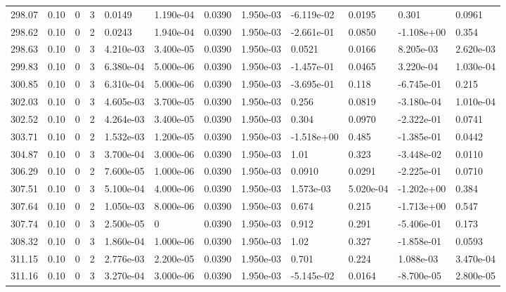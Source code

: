 \documentclass[preview]{standalone}
\begin{document}
{{{{{{{{{{\begin{tabular}{L{1.2cm}C{1.2cm} C{0.3cm}C{0.5cm} C{1.4cm}C{1.4cm} C{1.4cm}C{1.4cm} C{1.6cm}C{1.6cm} C{1.6cm}C{1.6cm}}
  298.07  &  0.10  & 0     &  3 &  0.0149  & 1.190e-04  &  0.0390&   1.950e-03& -6.119e-02 & 0.0195   &  0.301 & 0.0961  \\ 
  298.62  &  0.10  & 0     &  2 &  0.0243  & 1.940e-04  &  0.0390&   1.950e-03& -2.661e-01 & 0.0850   &  -1.108e+00 & 0.354  \\ 
  298.63  &  0.10  & 0     &  3 &  4.210e-03  & 3.400e-05  &  0.0390&   1.950e-03& 0.0521 & 0.0166   &  8.205e-03 & 2.620e-03  \\ 
  299.83  &  0.10  & 0     &  3 &  6.380e-04  & 5.000e-06  &  0.0390&   1.950e-03& -1.457e-01 & 0.0465   &  3.220e-04 & 1.030e-04  \\ 
  300.85  &  0.10  & 0     &  3 &  6.310e-04  & 5.000e-06  &  0.0390&   1.950e-03& -3.695e-01 & 0.118   &  -6.745e-01 & 0.215  \\ 
  302.03  &  0.10  & 0     &  3 &  4.605e-03  & 3.700e-05  &  0.0390&   1.950e-03& 0.256 & 0.0819   &  -3.180e-04 & 1.010e-04  \\ 
  302.52  &  0.10  & 0     &  2 &  4.264e-03  & 3.400e-05  &  0.0390&   1.950e-03& 0.304 & 0.0970   &  -2.322e-01 & 0.0741  \\ 
  303.71  &  0.10  & 0     &  2 &  1.532e-03  & 1.200e-05  &  0.0390&   1.950e-03& -1.518e+00 & 0.485   &  -1.385e-01 & 0.0442  \\ 
  304.87  &  0.10  & 0     &  3 &  3.700e-04  & 3.000e-06  &  0.0390&   1.950e-03& 1.01 & 0.323   &  -3.448e-02 & 0.0110  \\ 
  306.29  &  0.10  & 0     &  2 &  7.600e-05  & 1.000e-06  &  0.0390&   1.950e-03& 0.0910 & 0.0291   &  -2.225e-01 & 0.0710  \\ 
  307.51  &  0.10  & 0     &  3 &  5.100e-04  & 4.000e-06  &  0.0390&   1.950e-03& 1.573e-03 & 5.020e-04   &  -1.202e+00 & 0.384  \\ 
  307.64  &  0.10  & 0     &  2 &  1.050e-03  & 8.000e-06  &  0.0390&   1.950e-03& 0.674 & 0.215   &  -1.713e+00 & 0.547  \\ 
  307.74  &  0.10  & 0     &  3 &  2.500e-05  & 0  &  0.0390&   1.950e-03& 0.912 & 0.291   &  -5.406e-01 & 0.173  \\ 
  308.32  &  0.10  & 0     &  3 &  1.860e-04  & 1.000e-06  &  0.0390&   1.950e-03& 1.02 & 0.327   &  -1.858e-01 & 0.0593  \\ 
  311.15  &  0.10  & 0     &  2 &  2.776e-03  & 2.200e-05  &  0.0390&   1.950e-03& 0.701 & 0.224   &  1.088e-03 & 3.470e-04  \\ 
  311.16  &  0.10  & 0     &  3 &  3.270e-04  & 3.000e-06  &  0.0390&   1.950e-03& -5.145e-02 & 0.0164   &  -8.700e-05 & 2.800e-05  \\ 

\end{tabular}}}}}}}}}}}
\end{document}
